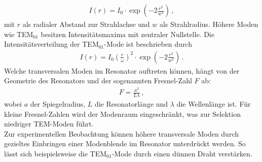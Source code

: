 \begin{align}
    I(r) = I_0 \cdot \exp\left(-2 \frac{r^2}{w^2} \right)\,, \label{eqn:intensitaet00}
\end{align}
mit $r$ als radialer Abstand zur Strahlachse und $w$ als Strahlradius. Höhere Moden wie TEM$_{01}$ besitzen Intensitätsmaxima mit zentraler Nullstelle. Die Intensitätsverteilung der TEM$_{01}$-Mode ist beschrieben durch
\begin{align}
    I(r) = I_0 \left(\frac{r}{\omega}\right)^2\cdot \exp\left(-2 \frac{r^2}{w^2} \right)\,. \label{eqn:intensitaet10}
\end{align}
Welche transversalen Moden im Resonator auftreten können, hängt von der Geometrie des Resonators und der sogenannten Fresnel-Zahl $F$ ab:
\begin{align}
    F = \frac{a^2}{L \lambda}\,, \label{eqn:fresnel}
\end{align}
wobei $a$ der Spiegelradius, $L$ die Resonatorlänge und $\lambda$ die Wellenlänge ist. Für kleine Fresnel-Zahlen wird der Modenraum eingeschränkt, was zur Selektion niedriger TEM-Moden führt.\\
Zur experimentellen Beobachtung können höhere transversale Moden durch gezieltes Einbringen einer Modenblende im Resonator unterdrückt werden. So lässt sich beispielsweise die TEM$_{01}$-Mode durch einen dünnen Draht verstärken. \cite{laserspektroskopie} \cite{laser} \cite{anleitungV61}


